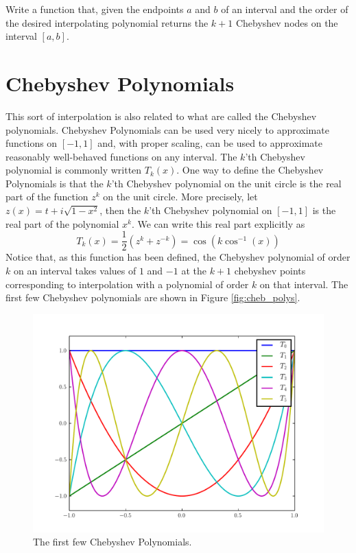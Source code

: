 \begin{problem}
Write a function that, given the endpoints $a$ and $b$ of an interval and the order of the desired interpolating polynomial returns the $k+1$ Chebyshev nodes on the interval $[ a, b ]$.
\end{problem}

\section*{Chebyshev Polynomials}
This sort of interpolation is also related to what are called the Chebyshev polynomials.
Chebyshev Polynomials can be used very nicely to approximate functions on $[ -1, 1 ]$ and, with proper scaling, can be used to approximate reasonably well-behaved functions on any interval.
The $k$'th Chebyshev polynomial is commonly written $T_k \left( x \right)$.
One way to define the Chebyshev Polynomials is that the $k$'th Chebyshev polynomial on the unit circle is the real part of the function $z^k$ on the unit circle.
More precisely, let $z(x) = t + i \sqrt{1 - x^2}$, then the $k$'th Chebyshev polynomial on $[-1, 1]$ is the real part of the polynomial $x^k$.
We can write this real part explicitly as
\[T_k \left( x \right) = \frac{1}{2} \left( z^k + z^{-k} \right) = \cos \left( k \cos^{-1} \left( x \right) \right)\]
Notice that, as this function has been defined, the Chebyshev polynomial of order $k$ on an interval takes values of $1$ and $-1$ at the $k+1$ chebyshev points corresponding to interpolation with a polynomial of order $k$ on that interval.
The first few Chebyshev polynomials are shown in Figure \ref{fig:cheb_polys}.

\begin{figure}
\includegraphics[width=\textwidth]{cheb_polys.pdf}
\caption{The first few Chebyshev Polynomials.}
\end{figure}

